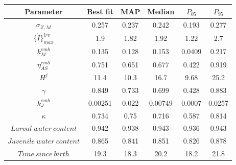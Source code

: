\begin{tabular}{cccccc}
\toprule
Parameter & Best fit & MAP & Median & $P_{05}$ & $P_{95}$\\
\midrule
$\sigma_{Z,M}$ & 0.257 & 0.237 & 0.242 & 0.193 & 0.277\\
$\{ \dot{I} \}_{max}^{lrv}$ & 1.9 & 1.82 & 1.92 & 1.22 & 2.7\\
$k_M^{emb}$ & 0.135 & 0.128 & 0.153 & 0.0409 & 0.217\\
$\eta_{AS}^{emb}$ & 0.751 & 0.651 & 0.677 & 0.422 & 0.919\\
$H^{j}$ & 11.4 & 10.3 & 16.7 & 9.68 & 25.2\\
$\gamma$ & 0.849 & 0.733 & 0.699 & 0.428 & 0.883\\
$k_J^{emb}$ & 0.00251 & 0.022 & 0.00749 & 0.0007 & 0.0257\\
$\kappa$ & 0.734 & 0.75 & 0.716 & 0.587 & 0.814\\
$Larval\ water\ content$ & 0.942 & 0.938 & 0.943 & 0.936 & 0.943\\
$Juvenile\ water\ content$ & 0.865 & 0.841 & 0.851 & 0.826 & 0.878\\
$Time\ since\ birth$ & 19.3 & 18.3 & 20.2 & 18.2 & 21.8\\
\bottomrule
\end{tabular}
